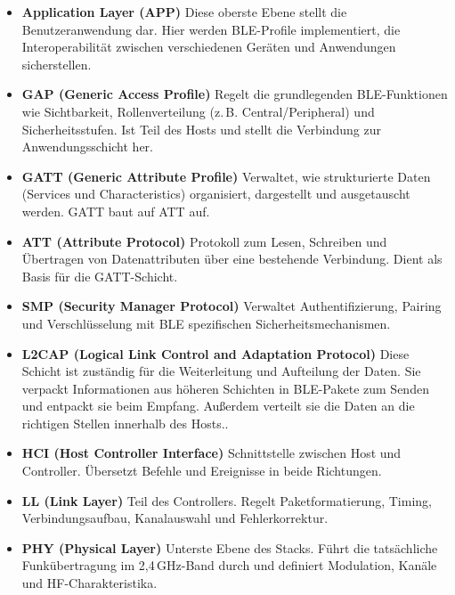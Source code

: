 \begin{itemize}
	\item \textbf{Application Layer (APP)}  Diese oberste Ebene stellt die Benutzeranwendung dar. Hier werden BLE-Profile implementiert, die Interoperabilität zwischen verschiedenen Geräten und Anwendungen sicherstellen.
	
	\item \textbf{GAP (Generic Access Profile)}  Regelt die grundlegenden BLE-Funktionen wie Sichtbarkeit, Rollenverteilung (z.\,B. Central/Peripheral) und Sicherheitsstufen. Ist Teil des Hosts und stellt die Verbindung zur Anwendungsschicht her.
	
	\item \textbf{GATT (Generic Attribute Profile)}  Verwaltet, wie strukturierte Daten (Services und Characteristics) organisiert, dargestellt und ausgetauscht werden. GATT baut auf ATT auf.
	
	\item \textbf{ATT (Attribute Protocol)}  Protokoll zum Lesen, Schreiben und Übertragen von Datenattributen über eine bestehende Verbindung. Dient als Basis für die GATT-Schicht.
	
	\item \textbf{SMP (Security Manager Protocol)}  Verwaltet Authentifizierung, Pairing und Verschlüsselung mit BLE spezifischen Sicherheitsmechanismen.
	
	\item \textbf{L2CAP (Logical Link Control and Adaptation Protocol)} Diese Schicht ist zuständig für die Weiterleitung und Aufteilung der Daten. Sie verpackt Informationen aus höheren Schichten in BLE-Pakete zum Senden und entpackt sie beim Empfang. Außerdem verteilt sie die Daten an die richtigen Stellen innerhalb des Hosts..
	
	\item \textbf{HCI (Host Controller Interface)}  Schnittstelle zwischen Host und Controller. Übersetzt Befehle und Ereignisse in beide Richtungen.
	
	\item \textbf{LL (Link Layer)}  Teil des Controllers. Regelt Paketformatierung, Timing, Verbindungsaufbau, Kanalauswahl und Fehlerkorrektur. 
	
	\item \textbf{PHY (Physical Layer)}  Unterste Ebene des Stacks. Führt die tatsächliche Funkübertragung im 2{,}4\,GHz-Band durch und definiert Modulation, Kanäle und HF-Charakteristika.
\end{itemize}
\cite{Tosi.2017} \cite{Morais.2023}

